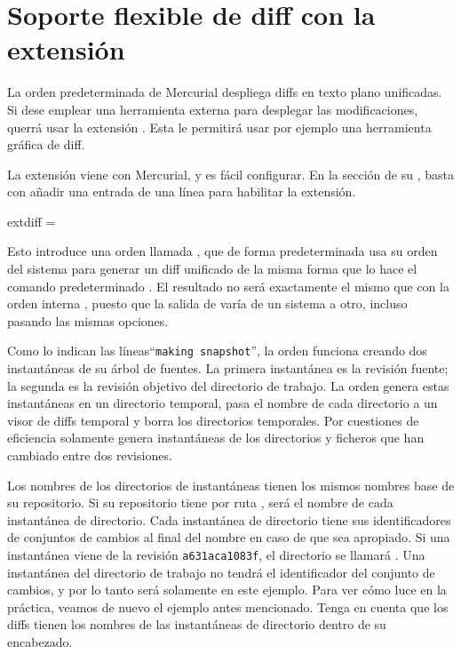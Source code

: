 \section{Soporte flexible de diff con la extensión }
\label{sec:hgext:extdiff}

La orden predeterminada  de Mercurial despliega diffs en
texto plano unificadas.
Si dese emplear una herramienta externa para desplegar las
modificaciones, querrá usar la extensión .  Esta le
permitirá usar por ejemplo una herramienta gráfica de diff.

La extensión  viene con Mercurial, y es fácil
configurar.  En la sección  de su \hgrc,
basta con añadir una entrada de una línea para habilitar la extensión.
\begin{codesample2}
  [extensions]
  extdiff =
\end{codesample2}
Esto introduce una orden llamada , que de
forma predeterminada usa su orden del sistema  para
generar un diff unificado de la misma forma que lo hace el comando
predeterminado .
El resultado no será exactamente el mismo que con la orden interna
, puesto que la salida de  varía de un
sistema a otro, incluso pasando las mismas opciones.

Como lo indican las líneas``\texttt{making snapshot}'', la orden
 funciona creando dos instantáneas de su
árbol de fuentes.  La primera instantánea es la revisión fuente; la
segunda es la revisión objetivo del directorio de trabajo.  La orden
 genera estas instantáneas en un directorio
temporal, pasa el nombre de cada directorio a un visor de diffs
temporal y borra los directorios temporales.  Por cuestiones de
eficiencia solamente genera instantáneas de los directorios y ficheros
que han cambiado entre dos revisiones.

Los nombres de los directorios de instantáneas tienen los mismos
nombres base de su repositorio.  Si su repositorio tiene por ruta
,  será el nombre de cada
instantánea de directorio.  Cada instantánea de directorio tiene sus
identificadores de conjuntos de cambios al final del nombre en caso de
que sea apropiado.  Si una instantánea viene de la revisión
\texttt{a631aca1083f}, el directorio se llamará
.  Una instantánea del directorio de trabajo
no tendrá el identificador del conjunto de cambios, y por lo tanto
será solamente  en este ejemplo.  Para ver cómo luce en
la práctica, veamos de nuevo el ejemplo 
antes mencionado.  Tenga en cuenta que los diffs tienen los nombres de
las instantáneas de directorio dentro de su encabezado.

